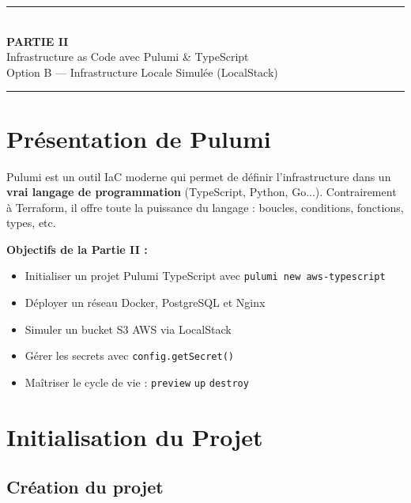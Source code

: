 \documentclass[12pt,a4paper]{article}
\begin{document}
\newpage
\begin{center}
  \rule{\linewidth}{2pt}\\[0.5em]
  {\LARGE\bfseries\textcolor{pulumiBlue}{PARTIE II}}\\[0.3em]
  {\Large Infrastructure as Code avec Pulumi \& TypeScript}\\[0.3em]
  {\normalsize Option B --- Infrastructure Locale Simulée (LocalStack)}\\[0.3em]
  \rule{\linewidth}{2pt}
\end{center}

\section{\textcolor{pulumiBlue}{Présentation de Pulumi}}

Pulumi est un outil IaC moderne qui permet de définir l'infrastructure dans
un \textbf{vrai langage de programmation} (TypeScript, Python, Go...).
Contrairement à Terraform, il offre toute la puissance du langage :
boucles, conditions, fonctions, types, etc.

\begin{pubox}
\textbf{Objectifs de la Partie II :}
\begin{itemize}[leftmargin=1.5em]
  \item Initialiser un projet Pulumi TypeScript avec \texttt{pulumi new aws-typescript}
  \item Déployer un réseau Docker, PostgreSQL et Nginx
  \item Simuler un bucket S3 AWS via LocalStack
  \item Gérer les secrets avec \texttt{config.getSecret()}
  \item Maîtriser le cycle de vie : \texttt{preview} \textrightarrow{} \texttt{up} \textrightarrow{} \texttt{destroy}
\end{itemize}
\end{pubox}

\section{\textcolor{pulumiBlue}{Initialisation du Projet}}

\subsection{Création du projet}
\end{document}
